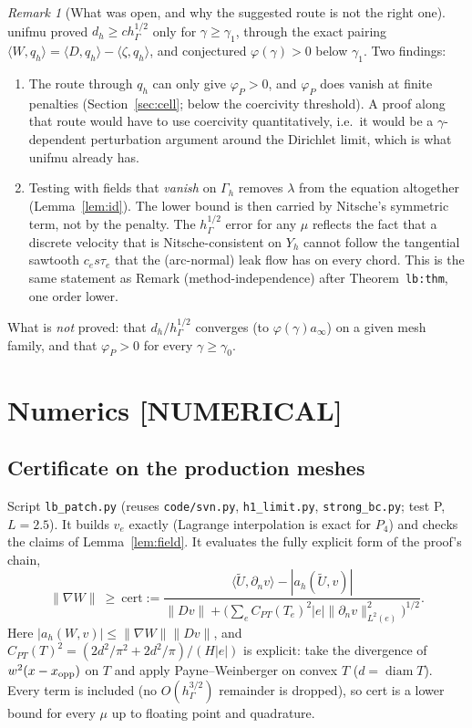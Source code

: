 \documentclass[11pt]{article}
\theoremstyle{remark}
\newtheorem{remark}[theorem]{Remark}
\newcommand{\hG}{h_\Gamma}
\newcommand{\Gh}{\Gamma_h}
\newcommand{\Yh}{Y_h}
\newcommand{\norm}[1]{\|#1\|}
\newcommand{\ip}[2]{\langle #1,#2\rangle}
\newcommand{\dn}{\partial_n}
\newcommand{\Ut}{\tilde U}
\newcommand{\lab}[1]{\textbf{[#1]}}
\begin{document}
\begin{remark}[What was open, and why the suggested route is not the right one]\label{rem:route}
unifmu proved $d_h\ge c\hG^{1/2}$ only for $\gamma\ge\gamma_1$, through the exact pairing $\ip W{q_h}=\ip D{q_h}-\ip\zeta{q_h}$, and conjectured $\varphi(\gamma)>0$ below $\gamma_1$. Two findings:
\begin{enumerate}[label=(\roman*)]
\item The route through $q_h$ can only give $\varphi_P>0$, and $\varphi_P$ does vanish at finite penalties (Section~\ref{sec:cell}; below the coercivity threshold). A proof along that route would have to use coercivity quantitatively, i.e.\ it would be a $\gamma$-dependent perturbation argument around the Dirichlet limit, which is what unifmu already has.
\item Testing with fields that \emph{vanish} on $\Gh$ removes $\lambda$ from the equation altogether (Lemma~\ref{lem:id}). The lower bound is then carried by Nitsche's symmetric term, not by the penalty. The $\hG^{1/2}$ error for any $\mu$ reflects the fact that a discrete velocity that is Nitsche-consistent on $\Yh$ cannot follow the tangential sawtooth $c_es\tau_e$ that the (arc-normal) leak flow has on every chord. This is the same statement as Remark (method-independence) after Theorem~\texttt{lb:thm}, one order lower.
\end{enumerate}
What is \emph{not} proved: that $d_h/\hG^{1/2}$ converges (to $\varphi(\gamma)a_\infty$) on a given mesh family, and that $\varphi_P>0$ for every $\gamma\ge\gamma_0$.
\end{remark}

\section{Numerics \lab{NUMERICAL}}
\subsection{Certificate on the production meshes}
Script \texttt{lb\_patch.py} (reuses \texttt{code/svn.py}, \texttt{h1\_limit.py}, \texttt{strong\_bc.py}; test P, $L=2.5$). It builds $v_e$ exactly (Lagrange interpolation is exact for $P_4$) and checks the claims of Lemma~\ref{lem:field}. It evaluates the fully explicit form of the proof's chain,
\[
\norm{\nabla W}\ \ge\ \mathrm{cert}:=\frac{\ip{\Ut}{\dn v}-|a_h(\Ut,v)|}{\norm{Dv}+\bigl(\sum_eC_{PT}(T_e)^2|e|\norm{\dn v}_{L^2(e)}^2\bigr)^{1/2}} .
\]
Here $|a_h(W,v)|\le\norm{\nabla W}\norm{Dv}$, and $C_{PT}(T)^2=(2d^2/\pi^2+2d^2/\pi)/(H|e|)$ is explicit: take the divergence of $w^2(x-x_{\rm opp})$ on $T$ and apply Payne--Weinberger on convex $T$ ($d=\operatorname{diam}T$). Every term is included (no $O(\hG^{3/2})$ remainder is dropped), so cert is a lower bound for every $\mu$ up to floating point and quadrature.
\end{document}
